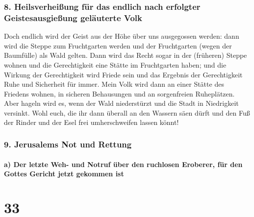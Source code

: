 \hypertarget{heilsverheiuxdfung-fuxfcr-das-endlich-nach-erfolgter-geistesausgieuxdfung-geluxe4uterte-volk}{%
\subsubsection{8. Heilsverheißung für das endlich nach erfolgter
Geistesausgießung geläuterte
Volk}\label{heilsverheiuxdfung-fuxfcr-das-endlich-nach-erfolgter-geistesausgieuxdfung-geluxe4uterte-volk}}

Doch endlich wird der Geist aus der Höhe über uns
ausgegossen werden: dann wird die Steppe zum Fruchtgarten werden und der
Fruchtgarten (wegen der Baumfülle) als Wald gelten. Dann
wird das Recht sogar in der (früheren) Steppe wohnen und die
Gerechtigkeit eine Stätte im Fruchtgarten haben; und die
Wirkung der Gerechtigkeit wird Friede sein und das Ergebnis der
Gerechtigkeit Ruhe und Sicherheit für immer. Mein Volk
wird dann an einer Stätte des Friedens wohnen, in sicheren Behausungen
und an sorgenfreien Ruheplätzen. Aber hageln wird es,
wenn der Wald niederstürzt und die Stadt in Niedrigkeit versinkt.
Wohl euch, die ihr dann überall an den Wassern säen dürft
und den Fuß der Rinder und der Esel frei umherschweifen lassen könnt!

\hypertarget{jerusalems-not-und-rettung}{%
\subsubsection{9. Jerusalems Not und
Rettung}\label{jerusalems-not-und-rettung}}

\hypertarget{a-der-letzte-weh--und-notruf-uxfcber-den-ruchlosen-eroberer-fuxfcr-den-gottes-gericht-jetzt-gekommen-ist}{%
\paragraph{a) Der letzte Weh- und Notruf über den ruchlosen Eroberer,
für den Gottes Gericht jetzt gekommen
ist}\label{a-der-letzte-weh--und-notruf-uxfcber-den-ruchlosen-eroberer-fuxfcr-den-gottes-gericht-jetzt-gekommen-ist}}

\hypertarget{section-32}{%
\section{33}\label{section-32}}

